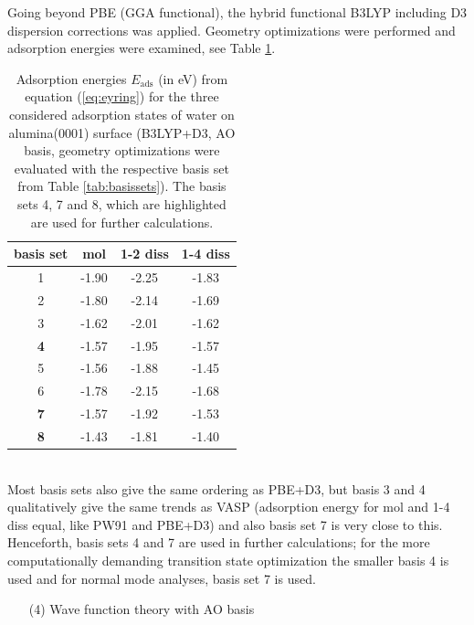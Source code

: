 \documentclass[11pt,DIV=13,BCOR=5mm,a4paper,headinclude]{scrbook}
\begin{document}
Going beyond PBE (GGA functional), the hybrid functional B3LYP including D3 dispersion corrections was applied.
Geometry optimizations were performed and adsorption energies were examined, see Table \ref{tab:basisset-results-B3LYP+D3}.
 \begin{table}[!h]
  \centering
   \caption{Adsorption energies $E_\textrm{ads}$ (in eV) from equation (\ref{eq:eyring}) for the three considered adsorption states of water on alumina(0001) surface (B3LYP+D3, AO basis, geometry optimizations were evaluated with the respective basis set from Table \ref{tab:basissets}).
   The basis sets 4, 7 and 8, which are highlighted are used for further calculations.}
  \begin{tabular}{c|ccc}
  \toprule
  basis set & mol & 1-2 diss & 1-4 diss \\\midrule
  1 &-1.90 &-2.25 &-1.83 \\
  2 &-1.80 &-2.14 &-1.69 \\
  3 &-1.62 &-2.01 &-1.62 \\
  \textbf{4} &-1.57 &-1.95 &-1.57 \\
  5 &-1.56 &-1.88 &-1.45 \\
  6 &-1.78 &-2.15 &-1.68 \\
  \textbf{7} &-1.57 &-1.92 &-1.53 \\
  \textbf{8} &-1.43 &-1.81 &-1.40 \\\bottomrule
  \end{tabular}
  \label{tab:basisset-results-B3LYP+D3}
\end{table}
\\
Most basis sets also give the same ordering as PBE+D3, but basis 3 and 4 qualitatively give the same trends as VASP (adsorption energy for mol and 1-4 diss equal, like PW91 and PBE+D3) and also basis set 7 is very close to this.
Henceforth, basis sets 4 and 7 are used in further calculations; for the more computationally demanding transition state optimization the smaller basis 4 is used and for normal mode analyses, basis set 7 is used.



% 

\begin{enumerate}
 \item[(4)] Wave function theory with AO basis
\end{enumerate}
\end{document}
